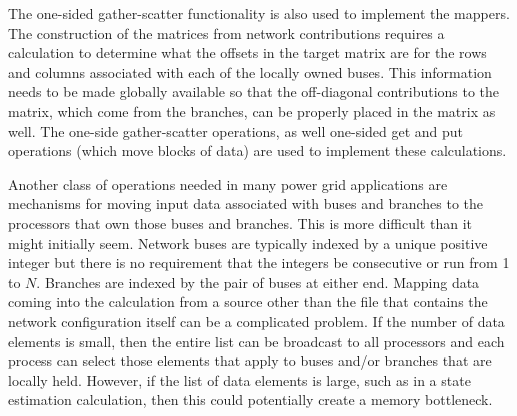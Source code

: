 \documentclass[preprint]{acm_proc_article-sp}
\begin{document}
The one-sided gather-scatter functionality is also used 
to implement the mappers. The construction of the matrices from network
contributions requires a calculation to determine what the offsets in the
target matrix are for the rows and columns associated with each of the locally
owned buses. This information needs to be made globally available so that the
off-diagonal contributions to the matrix, which come from the branches, can be
properly placed in the matrix as well. The one-side gather-scatter operations,
as well one-sided get and put operations (which move blocks of data) are used to
implement these calculations.

Another class of operations needed in many power grid applications are
mechanisms for moving input data associated with buses and branches to the
processors that own those buses and branches. This is more difficult than it
might initially seem. Network buses are typically indexed by a unique positive
integer but there is no requirement that the integers be consecutive or run from
1 to $N$. Branches are indexed by the pair of buses at either end. Mapping data
coming into the calculation from a source other than the file that contains the
network configuration itself can be a complicated problem. If the number of data
elements is small, then the entire list can be broadcast to all processors and
each process can select those elements that apply to buses and/or branches that
are locally held. However, if the list of data elements is large, such as in a
state estimation calculation, then this could potentially create a memory
bottleneck.
\end{document}
